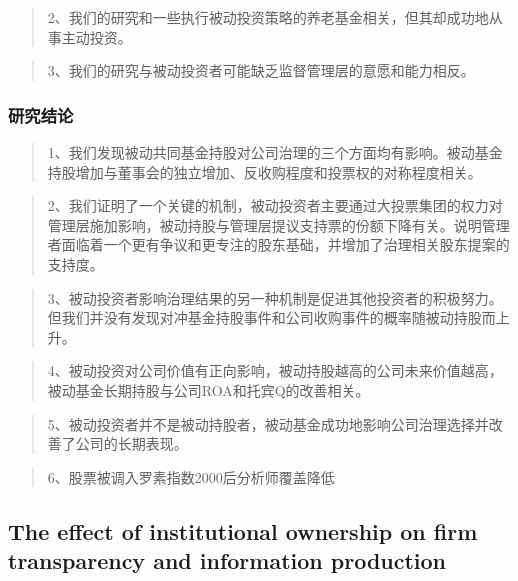 \documentclass[
]{article}
\begin{document}
\begin{quote}
2、我们的研究和一些执行被动投资策略的养老基金相关，但其却成功地从事主动投资。
\end{quote}

\begin{quote}
3、我们的研究与被动投资者可能缺乏监督管理层的意愿和能力相反。
\end{quote}

\hypertarget{ux7814ux7a76ux7ed3ux8bba-4}{%
\subsubsection{研究结论}\label{ux7814ux7a76ux7ed3ux8bba-4}}

\begin{quote}
1、我们发现被动共同基金持股对公司治理的三个方面均有影响。被动基金持股增加与董事会的独立增加、反收购程度和投票权的对称程度相关。
\end{quote}

\begin{quote}
2、我们证明了一个关键的机制，被动投资者主要通过大投票集团的权力对管理层施加影响，被动持股与管理层提议支持票的份额下降有关。说明管理者面临着一个更有争议和更专注的股东基础，并增加了治理相关股东提案的支持度。
\end{quote}

\begin{quote}
3、被动投资者影响治理结果的另一种机制是促进其他投资者的积极努力。但我们并没有发现对冲基金持股事件和公司收购事件的概率随被动持股而上升。
\end{quote}

\begin{quote}
4、被动投资对公司价值有正向影响，被动持股越高的公司未来价值越高，被动基金长期持股与公司ROA和托宾Q的改善相关。
\end{quote}

\begin{quote}
5、被动投资者并不是被动持股者，被动基金成功地影响公司治理选择并改善了公司的长期表现。
\end{quote}

\begin{quote}
6、股票被调入罗素指数2000后分析师覆盖降低
\end{quote}

\hypertarget{the-effect-of-institutional-ownership-on-firm-transparency-and-information-production}{%
\subsection{The effect of institutional ownership on firm transparency
and information
production}\label{the-effect-of-institutional-ownership-on-firm-transparency-and-information-production}}
\end{document}
